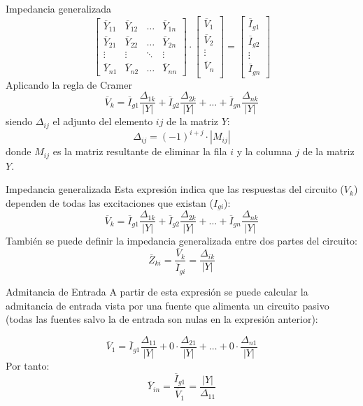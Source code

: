 \documentclass[aspectratio=169, usenames,svgnames,dvipsnames]{beamer}
\begin{document}
\begin{frame}[label={sec:org31efa6f}]{Impedancia generalizada}
\begin{equation*}
  \begin{bmatrix}
    \overline{Y}_{11} & \overline{Y}_{12} & \dots & \overline{Y}_{1n} \\
    \overline{Y}_{21} & \overline{Y}_{22} & \dots & \overline{Y}_{2n} \\
    \vdots & \vdots & \ddots & \vdots \\
    \overline{Y}_{n1} & \overline{Y}_{n2} &  \dots & \overline{Y}_{nn}
  \end{bmatrix} \cdot %
  \begin{bmatrix}
    \overline{V}_1\\
    \overline{V}_2\\
    \vdots \\
    \overline{V}_n\\
  \end{bmatrix} = %
  \begin{bmatrix}
    \overline{I}_{g1}\\
    \overline{I}_{g2}\\
    \vdots \\
    \overline{I}_{gn}
  \end{bmatrix}
\end{equation*}
Aplicando la regla de Cramer
\[
  \overline{V}_k = \overline{I}_{g1} \frac{\Delta_{1k}}{|Y|} + \overline{I}_{g2} \frac{\Delta_{2k}}{|Y|} + \dots + \overline{I}_{gn} \frac{\Delta_{nk}}{|Y|}
\]
siendo \(\Delta_{ij}\) el adjunto del elemento \(ij\) de la matriz \(Y\):
\[
  \Delta_{ij} = (-1)^{i+j} \cdot |M_{ij}|
\]
donde \(M_{ij}\) es la matriz resultante de eliminar la fila \(i\) y la columna \(j\) de la matriz \(Y\).
\end{frame}

\begin{frame}[label={sec:org98a18e4}]{Impedancia generalizada}
Esta expresión indica que las respuestas del circuito (\(V_k\)) dependen de todas las excitaciones que existan (\(I_{gi}\)):
\[
  \overline{V}_k = \overline{I}_{g1} \frac{\Delta_{1k}}{|Y|} + \overline{I}_{g2} \frac{\Delta_{2k}}{|Y|} + \dots + \overline{I}_{gn} \frac{\Delta_{nk}}{|Y|}
\]
También se puede definir la impedancia generalizada entre dos partes del circuito:
\[
  \overline{Z}_{ki} = \frac{\overline{V}_k}{\overline{I}_{gi}} = \frac{\Delta_{ik}}{|Y|}
\]
\end{frame}

\begin{frame}[label={sec:org4aa8c60}]{Admitancia de Entrada}
A partir de esta expresión se puede calcular la admitancia de entrada vista por una fuente que alimenta un circuito pasivo (todas las fuentes salvo la de entrada son nulas en la expresión anterior):

\[
  \overline{V}_1 = \overline{I}_{g1} \frac{\Delta_{11}}{|Y|} + 0 \cdot \frac{\Delta_{21}}{|Y|} + \dots + 0 \cdot \frac{\Delta_{n1}}{|Y|}
\]
Por tanto:
\[
  \boxed{\overline{Y}_{in} = \frac{\overline{I}_{g1}}{\overline{V}_1}=  \frac{|Y|}{\Delta_{11}}}
\]
\end{frame}
\end{document}

